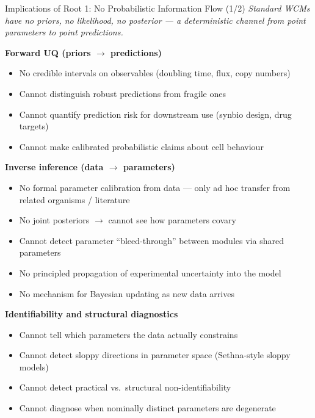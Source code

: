 \documentclass[aspectratio=169]{beamer}
\begin{document}
\begin{frame}[noframenumbering]{Implications of Root 1: No Probabilistic Information Flow (1/2)}
	\scriptsize
	\textit{Standard WCMs have no priors, no likelihood, no posterior --- a deterministic channel from point parameters to point predictions.}

	\smallskip
	\textbf{Forward UQ (priors $\to$ predictions)}
	\begin{itemize}\itemsep0pt\parskip0pt
		\item No credible intervals on observables (doubling time, flux, copy numbers)
		\item Cannot distinguish robust predictions from fragile ones
		\item Cannot quantify prediction risk for downstream use (synbio design, drug targets)
		\item Cannot make calibrated probabilistic claims about cell behaviour
	\end{itemize}

	\smallskip
	\textbf{Inverse inference (data $\to$ parameters)}
	\begin{itemize}\itemsep0pt\parskip0pt
		\item No formal parameter calibration from data --- only ad hoc transfer from related organisms / literature
		\item No joint posteriors $\to$ cannot see how parameters covary
		\item Cannot detect parameter ``bleed-through'' between modules via shared parameters
		\item No principled propagation of experimental uncertainty into the model
		\item No mechanism for Bayesian updating as new data arrives
	\end{itemize}

	\smallskip
	\textbf{Identifiability and structural diagnostics}
	\begin{itemize}\itemsep0pt\parskip0pt
		\item Cannot tell which parameters the data actually constrains
		\item Cannot detect sloppy directions in parameter space (Sethna-style sloppy models)
		\item Cannot detect practical vs.\ structural non-identifiability
		\item Cannot diagnose when nominally distinct parameters are degenerate
	\end{itemize}
\end{frame}
\end{document}
